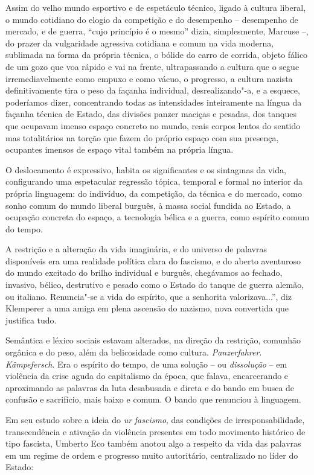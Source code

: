 Assim do velho mundo esportivo e de espetáculo técnico, ligado à cultura
liberal, o mundo cotidiano do elogio da competição e do desempenho --
desempenho de mercado, e de guerra, ``cujo princípio é o mesmo'' dizia,
simplesmente, Marcuse --, do prazer da vulgaridade agressiva cotidiana e
comum na vida moderna, sublimada na forma da própria técnica, o bólide
do carro de corrida, objeto fálico de um gozo que voa rápido e vai na
frente, ultrapassando a cultura que o segue irremediavelmente como
empuxo e como vácuo, o progresso, a cultura nazista definitivamente tira
o peso da façanha individual, desrealizando"-a, e a esquece, poderíamos
dizer, concentrando todas as intensidades inteiramente na língua da
façanha técnica de Estado, das divisões panzer maciças e pesadas, dos
tanques que ocupavam imenso espaço concreto no mundo, reais corpos
lentos do sentido mas totalitários na torção que fazem do próprio espaço
com sua presença, ocupantes imensos de espaço vital também na própria
língua.

O deslocamento é expressivo, habita os significantes e os sintagmas da
vida, configurando uma espetacular regressão tópica, temporal e formal
no interior da própria linguagem: do indivíduo, da competição, da
técnica e do mercado, como sonho comum do mundo liberal burguês, à massa
social fundida ao Estado, a ocupação concreta do espaço, a tecnologia
bélica e a guerra, como espírito comum do tempo.

A restrição e a alteração da vida imaginária, e do universo de palavras
disponíveis era uma realidade política clara do fascismo, e do aberto
aventuroso do mundo excitado do brilho individual e burguês, chegávamos
ao fechado, invasivo, bélico, destrutivo e pesado como o Estado do
tanque de guerra alemão, ou italiano. Renuncia"-se a vida do espírito,
que a senhorita valorizava...'', diz Klemperer a uma amiga em plena
ascensão do nazismo, nova convertida que justifica tudo.

Semântica e léxico sociais estavam alterados, na direção da restrição,
comunhão orgânica e do peso, além da belicosidade como cultura.
\emph{Panzerfahrer}. \emph{Kämpefersch}. Era o espírito do tempo, de uma
solução -- ou \emph{dissolução} -- em violência da crise aguda do
capitalismo da época, que falava, encarcerando e aproximando as palavras
da luta desabusada e direta e do bando em busca de confusão e
sacrifício, mais baixo e comum. O bando que renunciou à linguagem.

Em seu estudo sobre a ideia do \emph{ur} \emph{fascismo}, das condições
de irresponsabilidade, transcendência e ativação da violência presentes
em todo movimento histórico de tipo fascista, Umberto Eco também anotou
algo a respeito da vida das palavras em um regime de ordem e progresso
muito autoritário, centralizado no líder do Estado:

